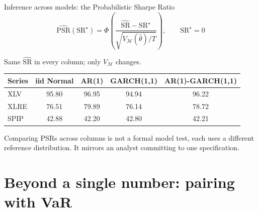 \documentclass[aspectratio=169,10pt]{beamer}
\begin{document}
\begin{frame}{Inference across models: the Probabilistic Sharpe Ratio}
  \[ \widehat{\mathrm{PSR}}(\mathrm{SR}^\star)
     = \Phi\!\left(\frac{\widehat{\mathrm{SR}} - \mathrm{SR}^\star}
                        {\sqrt{V_{\mathcal{M}}(\hat\theta)/T}}\right),
     \qquad \mathrm{SR}^\star = 0 \]

  {\small Same $\widehat{\mathrm{SR}}$ in every column; only $V_{\mathcal{M}}$ changes.}

  \vspace{0.5em}
  \centering
  \footnotesize
  \begin{tabular}{@{}lcccc@{}}
    \toprule
    Series & iid Normal & AR(1) & GARCH(1,1) & AR(1)-GARCH(1,1) \\
    \midrule
    XLV  & \alert{95.80} & 96.95 & 94.94 & \alert{96.22} \\
    XLRE & 76.51         & 79.89 & 76.14 & 78.72 \\
    SPIP & 42.88         & 42.20 & 42.80 & 42.21 \\
    \bottomrule
  \end{tabular}

  \normalsize
  \vspace{0.4em}


  \vspace{0.3em}
  {\scriptsize Comparing PSRs across columns is not a formal model test, each uses a
  different reference distribution. It mirrors an analyst committing to one specification.}
\end{frame}

\section{Beyond a single number: pairing with VaR}
\end{document}
